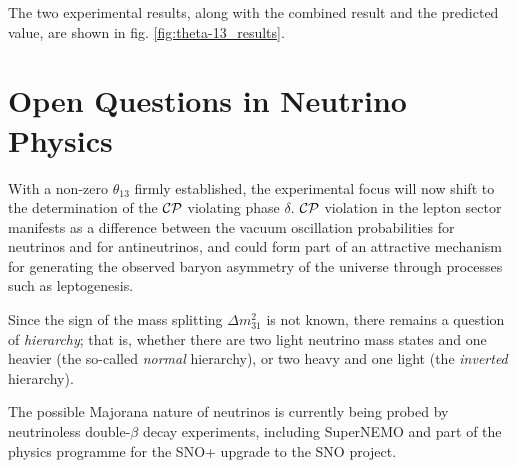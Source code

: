The two experimental results, along with the combined result and the predicted value, are shown in fig. \ref{fig:theta-13_results}.

\section{Open Questions in Neutrino Physics}
With a non-zero $\theta_{13}$ firmly established, the experimental focus will now shift to the determination of the $\mathcal{C}\mathcal{P}$ violating phase $\delta$. $\mathcal{C}\mathcal{P}$ violation in the lepton sector manifests as a difference between the vacuum oscillation probabilities for neutrinos and for antineutrinos, and could form part of an attractive mechanism for generating the observed baryon asymmetry of the universe through processes such as leptogenesis\citep{Riotto1999}.

Since the sign of the mass splitting $\Delta m^2_{31}$ is not known, there remains a question of \emph{hierarchy}; that is, whether there are two light neutrino mass states and one heavier (the so-called \emph{normal} hierarchy), or two heavy and one light (the \emph{inverted} hierarchy). 

The possible Majorana nature of neutrinos is currently being probed by neutrinoless double-$\beta$ decay experiments, including SuperNEMO\citep{SuperNEMO} and part of the physics programme for the SNO+ upgrade\citep{SNO+} to the SNO project.
